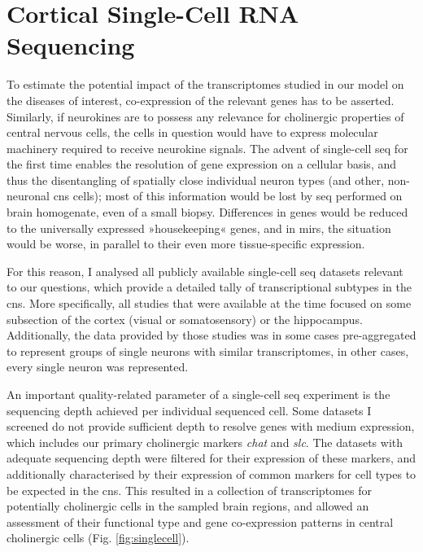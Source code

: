 \section{Cortical Single-Cell RNA Sequencing}
To estimate the potential impact of the transcriptomes studied in our model on the diseases of interest, co-expression of the relevant genes has to be asserted. Similarly, if neurokines are to possess any relevance for cholinergic properties of central nervous cells, the cells in question would have to express molecular machinery required to receive neurokine signals. The advent of single-cell \ac{seq} for the first time enables the resolution of gene expression on a cellular basis, and thus the disentangling of spatially close individual neuron types (and other, non-neuronal \ac{cns} cells); most of this information would be lost by \ac{seq} performed on brain homogenate, even of a small biopsy. Differences in genes would be reduced to the universally expressed »housekeeping« genes, and in \acp{mir}, the situation would be worse, in parallel to their even more tissue-specific expression.

For this reason, I analysed all publicly available single-cell \ac{seq} datasets relevant to our questions, which provide a detailed tally of transcriptional subtypes in the \ac{cns}. More specifically, all studies that were available at the time focused on some subsection of the cortex (visual or somatosensory) or the hippocampus. Additionally, the data provided by those studies was in some cases pre-aggregated to represent groups of single neurons with similar transcriptomes\cite{Zeisel2015, Tasic2016}, in other cases, every single neuron was represented\cite{Darmanis2015, Habib2016}. 

An important quality-related parameter of a single-cell \ac{seq} experiment is the sequencing depth achieved per individual sequenced cell. Some datasets I screened do not provide sufficient depth to resolve genes with medium expression, which includes our primary cholinergic markers \textit{\ac{chat}} and \textit{\ac{slc}}. The datasets with adequate sequencing depth were filtered for their expression of these markers, and additionally characterised by their expression of common markers for cell types to be expected in the \ac{cns}. This resulted in a collection of transcriptomes for potentially cholinergic cells in the sampled brain regions, and allowed an assessment of their functional type and gene co-expression patterns in central cholinergic cells (Fig. \ref{fig:singlecell}).


